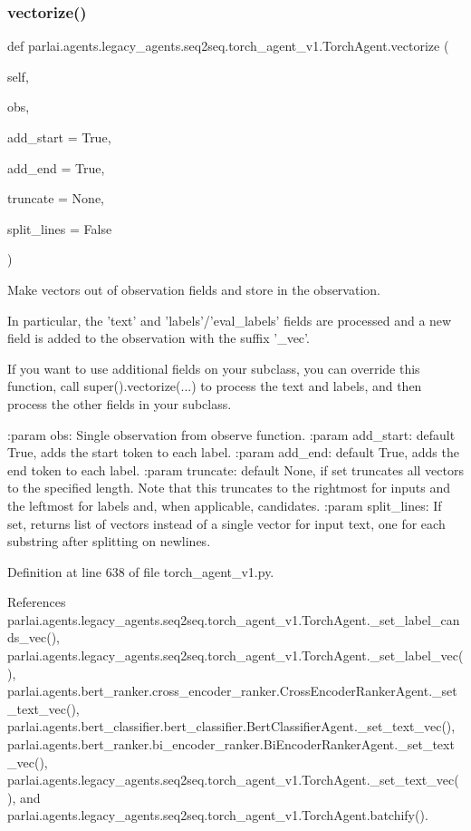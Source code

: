 \subsubsection{\texorpdfstring{vectorize()}{vectorize()}}
{\footnotesize\ttfamily def parlai.\+agents.\+legacy\+\_\+agents.\+seq2seq.\+torch\+\_\+agent\+\_\+v1.\+Torch\+Agent.\+vectorize (\begin{DoxyParamCaption}\item[{}]{self,  }\item[{}]{obs,  }\item[{}]{add\+\_\+start = {\ttfamily True},  }\item[{}]{add\+\_\+end = {\ttfamily True},  }\item[{}]{truncate = {\ttfamily None},  }\item[{}]{split\+\_\+lines = {\ttfamily False} }\end{DoxyParamCaption})}

\begin{DoxyVerb}Make vectors out of observation fields and store in the observation.

In particular, the 'text' and 'labels'/'eval_labels' fields are
processed and a new field is added to the observation with the suffix
'_vec'.

If you want to use additional fields on your subclass, you can override
this function, call super().vectorize(...) to process the text and
labels, and then process the other fields in your subclass.

:param obs:         Single observation from observe function.
:param add_start:   default True, adds the start token to each label.
:param add_end:     default True, adds the end token to each label.
:param truncate:    default None, if set truncates all vectors to the
            specified length. Note that this truncates to the
            rightmost for inputs and the leftmost for labels
            and, when applicable, candidates.
:param split_lines: If set, returns list of vectors instead of a single
            vector for input text, one for each substring after
            splitting on newlines.
\end{DoxyVerb}
 

Definition at line 638 of file torch\+\_\+agent\+\_\+v1.\+py.



References parlai.\+agents.\+legacy\+\_\+agents.\+seq2seq.\+torch\+\_\+agent\+\_\+v1.\+Torch\+Agent.\+\_\+set\+\_\+label\+\_\+cands\+\_\+vec(), parlai.\+agents.\+legacy\+\_\+agents.\+seq2seq.\+torch\+\_\+agent\+\_\+v1.\+Torch\+Agent.\+\_\+set\+\_\+label\+\_\+vec(), parlai.\+agents.\+bert\+\_\+ranker.\+cross\+\_\+encoder\+\_\+ranker.\+Cross\+Encoder\+Ranker\+Agent.\+\_\+set\+\_\+text\+\_\+vec(), parlai.\+agents.\+bert\+\_\+classifier.\+bert\+\_\+classifier.\+Bert\+Classifier\+Agent.\+\_\+set\+\_\+text\+\_\+vec(), parlai.\+agents.\+bert\+\_\+ranker.\+bi\+\_\+encoder\+\_\+ranker.\+Bi\+Encoder\+Ranker\+Agent.\+\_\+set\+\_\+text\+\_\+vec(), parlai.\+agents.\+legacy\+\_\+agents.\+seq2seq.\+torch\+\_\+agent\+\_\+v1.\+Torch\+Agent.\+\_\+set\+\_\+text\+\_\+vec(), and parlai.\+agents.\+legacy\+\_\+agents.\+seq2seq.\+torch\+\_\+agent\+\_\+v1.\+Torch\+Agent.\+batchify().



